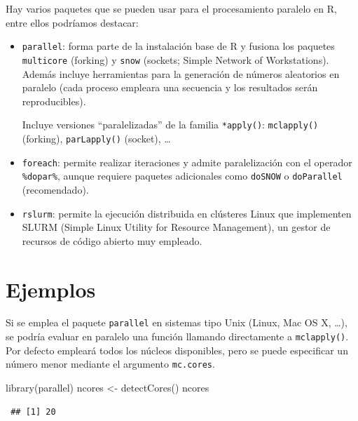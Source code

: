 \documentclass[
]{book}
\newenvironment{Shaded}{\begin{snugshade}}{\end{snugshade}}
\newcommand{\FunctionTok}[1]{\textcolor[rgb]{0.00,0.00,0.00}{#1}}
\newcommand{\NormalTok}[1]{#1}
\newcommand{\OtherTok}[1]{\textcolor[rgb]{0.56,0.35,0.01}{#1}}
\theoremstyle{break}
\theoremstyle{nonumberplain}
\begin{document}
Hay varios paquetes que se pueden usar para el procesamiento paralelo en R,
entre ellos podríamos destacar:

\begin{itemize}
\item
  \texttt{parallel}: forma parte de la instalación base de R y fusiona los paquetes \texttt{multicore} (forking) y \texttt{snow} (sockets; Simple Network of Workstations).
  Además incluye herramientas para la generación de números aleatorios en paralelo (cada proceso empleara una secuencia y los resultados serán reproducibles).

  Incluye versiones ``paralelizadas'' de la familia \texttt{*apply()}:
  \texttt{mclapply()} (forking), \texttt{parLapply()} (socket), \ldots{}
\item
  \texttt{foreach}: permite realizar iteraciones y admite paralelización con el operador \texttt{\%dopar\%}, aunque requiere paquetes adicionales como \texttt{doSNOW} o \texttt{doParallel} (recomendado).
\item
  \texttt{rslurm}: permite la ejecución distribuida en clústeres Linux que implementen SLURM (Simple Linux Utility for Resource Management), un gestor de recursos de código abierto muy empleado.
\end{itemize}

\hypertarget{ejemplos}{%
\section{Ejemplos}\label{ejemplos}}

Si se emplea el paquete \texttt{parallel} en sistemas tipo Unix (Linux, Mac OS X, \ldots), se podría evaluar en paralelo una función llamando directamente a \texttt{mclapply()}.
Por defecto empleará todos los núcleos disponibles, pero se puede especificar un número menor mediante el argumento \texttt{mc.cores}.

\begin{Shaded}
\begin{Highlighting}[]
\FunctionTok{library}\NormalTok{(parallel)}
\NormalTok{ncores }\OtherTok{\textless{}{-}} \FunctionTok{detectCores}\NormalTok{()}
\NormalTok{ncores}
\end{Highlighting}
\end{Shaded}

\begin{verbatim}
 ## [1] 20
\end{verbatim}
\end{document}
